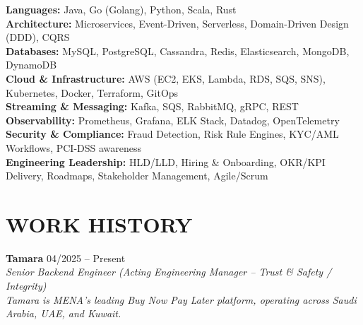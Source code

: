 \documentclass[a4paper,11pt]{article}
\begin{document}
\textbf{Languages:} Java, Go (Golang), Python, Scala, Rust \\
\textbf{Architecture:} Microservices, Event-Driven, Serverless, Domain-Driven Design (DDD), CQRS \\
\textbf{Databases:} MySQL, PostgreSQL, Cassandra, Redis, Elasticsearch, MongoDB, DynamoDB \\
\textbf{Cloud \& Infrastructure:} AWS (EC2, EKS, Lambda, RDS, SQS, SNS), Kubernetes, Docker, Terraform, GitOps \\
\textbf{Streaming \& Messaging:} Kafka, SQS, RabbitMQ, gRPC, REST \\
\textbf{Observability:} Prometheus, Grafana, ELK Stack, Datadog, OpenTelemetry \\
\textbf{Security \& Compliance:} Fraud Detection, Risk Rule Engines, KYC/AML Workflows, PCI-DSS awareness \\
\textbf{Engineering Leadership:} HLD/LLD, Hiring \& Onboarding, OKR/KPI Delivery, Roadmaps, Stakeholder Management, Agile/Scrum

\vspace{6pt}

\section*{WORK HISTORY}

\noindent
\textbf{Tamara} \hfill 04/2025 -- Present \\
\textit{Senior Backend Engineer (Acting Engineering Manager -- Trust \& Safety / Integrity)} \\
{\small \textit{Tamara is MENA's leading Buy Now Pay Later platform, operating across Saudi Arabia, UAE, and Kuwait.}}

\vspace{3pt}
\end{document}
